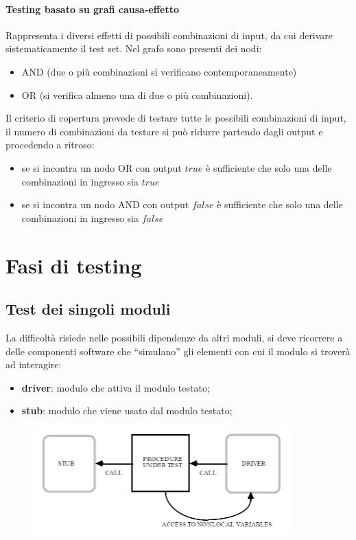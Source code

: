 \paragraph{Testing basato su grafi causa-effetto} Rappresenta i diversi effetti di possibili combinazioni di input, da cui derivare sistematicamente il test set. Nel grafo sono presenti dei nodi:
\begin{itemize}
    \item AND (due o più combinazioni si verificano contemporaneamente) 
	\item OR (si verifica almeno una di due o più combinazioni).
\end{itemize}
Il criterio di copertura prevede di testare tutte le possibili combinazioni di input, il numero di combinazioni da testare si può ridurre partendo dagli output e procedendo a ritroso:
\begin{itemize}
	\item se si incontra un nodo OR con output $true$ è sufficiente che solo una delle combinazioni in ingresso sia $true$ 
	\item se si incontra un nodo AND con output $false$ è sufficiente che solo una delle combinazioni in ingresso sia $false$
\end{itemize}

\section{Fasi di testing}

\subsection{Test dei singoli moduli}

La difficoltà risiede nelle possibili dipendenze da altri moduli, si deve ricorrere a delle componenti software che “simulano” gli elementi con cui il modulo si troverà ad interagire:
\begin{itemize}
    \item \textbf{driver}: modulo che attiva il modulo testato; 
	\item \textbf{stub}: modulo che viene usato dal modulo testato;
\end{itemize}

\begin{figure}[h!]
    \centering
    \includegraphics[width=0.75\linewidth]{assets/driver-stub.png}
    \label{fig:driver-stub}
\end{figure}

